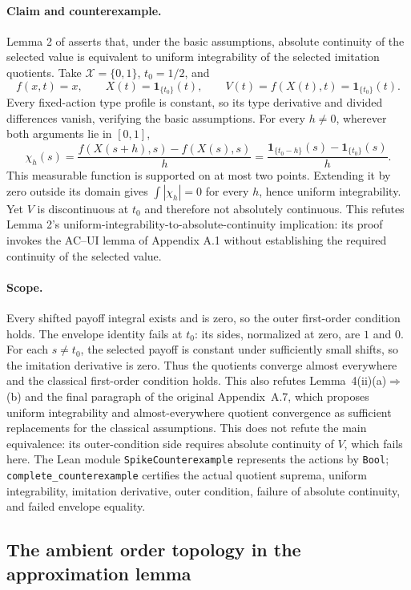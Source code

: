 \documentclass[11pt]{article}
\theoremstyle{remark}\newtheorem{remark}[theorem]{Remark}
\newcommand{\ind}{\mathbf 1}
\begin{document}
\paragraph{Claim and counterexample.}
Lemma 2 of \citet[Appendix A.4]{Sinander2022} asserts that, under the
basic assumptions, absolute continuity of the selected value is
equivalent to uniform integrability of the selected imitation
quotients.  Take $\mathcal X=\{0,1\}$, $t_0=1/2$, and
\[
 f(x,t)=x,\qquad X(t)=\ind_{\{t_0\}}(t),\qquad
 V(t)=f(X(t),t)=\ind_{\{t_0\}}(t).
\]
Every fixed-action type profile is constant, so its type derivative and
divided differences vanish, verifying the basic assumptions.
For every $h\ne0$, wherever both arguments lie in $[0,1]$,
\[
 \chi_h(s)=\frac{f(X(s+h),s)-f(X(s),s)}h
 =\frac{\ind_{\{t_0-h\}}(s)-\ind_{\{t_0\}}(s)}h.
\]
This measurable function is supported on at most two points.
Extending it by zero outside its domain gives $\int |\chi_h|=0$ for
every $h$, hence uniform integrability.  Yet $V$ is discontinuous at
$t_0$ and therefore not absolutely continuous.  This refutes Lemma 2's
uniform-integrability-to-absolute-continuity implication: its proof
invokes the AC--UI lemma of Appendix A.1 without establishing the
required continuity of the selected value.

\paragraph{Scope.}
Every shifted payoff integral exists and is zero, so the outer
first-order condition holds.  The envelope identity fails at $t_0$:
its sides, normalized at zero, are $1$ and $0$.
For each $s\ne t_0$, the selected payoff is constant under sufficiently
small shifts, so the imitation derivative is zero.  Thus the quotients
converge almost everywhere and the classical first-order condition
holds.  This also refutes Lemma~4(ii)(a)$\Rightarrow$(b) and the final
paragraph of the original Appendix~A.7, which proposes uniform
integrability and almost-everywhere quotient convergence as sufficient
replacements for the classical assumptions.
This does not refute the main equivalence: its outer-condition side
requires absolute continuity of $V$, which fails here.
The Lean module \texttt{SpikeCounterexample} represents the actions by
\texttt{Bool}; \texttt{complete\_counterexample} certifies the actual
quotient suprema, uniform integrability, imitation derivative, outer
condition, failure of absolute continuity, and failed envelope equality.

\subsection{The ambient order topology in the approximation lemma}
\label{app:audit-order-topology}
\end{document}
